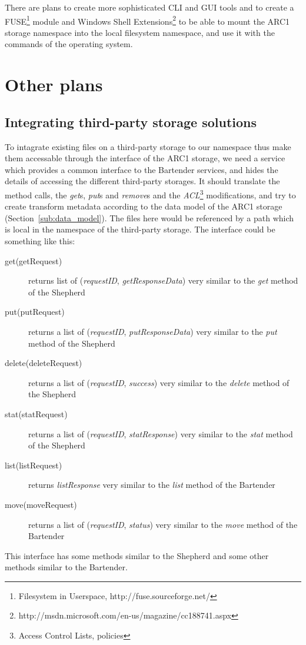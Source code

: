 \documentclass{book}
\begin{document}
There are plans to create more sophisticated CLI and GUI tools and to create a FUSE\footnote{Filesystem in Userspace, http://fuse.sourceforge.net/} module and Windows Shell Extensions\footnote{http://msdn.microsoft.com/en-us/magazine/cc188741.aspx} to be able to mount the ARC1 storage namespace into the local filesystem namespace, and use it with the commands of the operating system.


\section{Other plans} %

\subsection{Integrating third-party storage solutions} %
\label{sub:integrating_third_party_storage_solutions}

To intagrate existing files on a third-party storage to our namespace thus make them accessable through the interface of the ARC1 storage, we need a service which provides a common interface to the Bartender services, and hides the details of accessing the different third-party storages. It should translate the method calls, the \emph{get}s, \emph{put}s and \emph{remove}s and the \emph{ACL}\footnote{Access Control Lists, policies} modifications, and try to create transform metadata according to the data model of the ARC1 storage (Section~\ref{sub:data_model}). The files here would be referenced by a path which is local in the namespace of the third-party storage. The interface could be something like this:
\begin{description}
    \item[get(getRequest)] returns list of (\emph{requestID}, \emph{getResponseData})
    very similar to the \emph{get} method of the Shepherd
    \item[put(putRequest)] returns a list of (\emph{requestID}, \emph{putResponseData})
    very similar to the \emph{put} method of the Shepherd
    \item[delete(deleteRequest)] returns a list of (\emph{requestID}, \emph{success})
    very similar to the \emph{delete} method of the Shepherd
    \item[stat(statRequest)] returns a list of (\emph{requestID}, \emph{statResponse})
    very similar to the \emph{stat} method of the Shepherd
    \item[list(listRequest)] returns \emph{listResponse}
    very similar to the \emph{list} method of the Bartender
    \item[move(moveRequest)] returns a list of (\emph{requestID}, \emph{status})
    very similar to the \emph{move} method of the Bartender
\end{description}
This interface has some methods similar to the Shepherd and some other methods similar to the Bartender.
\end{document}
